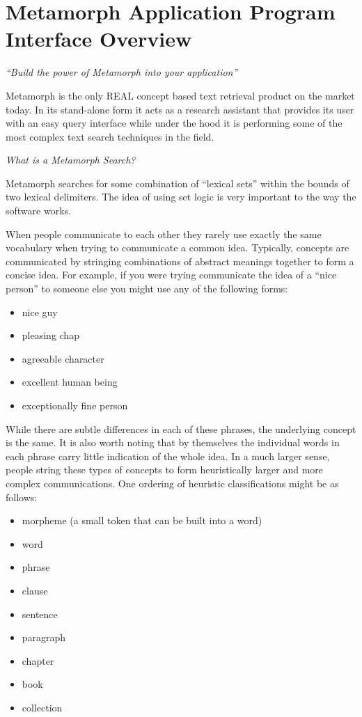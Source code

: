 %
\chapter{Metamorph Application Program Interface Overview}
{\em ``Build the power of Metamorph into your application''}

Metamorph is the only REAL concept based text retrieval product on
the market today.  In its stand-alone form it acts as a research
assistant that provides its user with an easy query interface
while under the hood it is performing some of the most complex
text search techniques in the field.

{\em What is a Metamorph Search?}

Metamorph searches for some combination of ``lexical sets'' within
the bounds of two lexical delimiters.  The idea of using set logic
is very important to the way the software works.

When people communicate to each other they rarely use exactly the
same vocabulary when trying to communicate a common idea.
Typically, concepts are communicated by stringing combinations of
abstract meanings together to form a concise idea.  For example,
if you were trying communicate the idea of a ``nice person'' to
someone else you might use any of the following forms:

\begin{itemize}
\item nice guy
\item pleasing chap
\item agreeable character
\item excellent human being
\item exceptionally fine person
\end{itemize}

While there are subtle differences in each of these phrases, the
underlying concept is the same.  It is also worth noting that by
themselves the individual words in each phrase carry little
indication of the whole idea.  In a much larger sense, people
string these types of concepts to form heuristically larger and
more complex communications.  One ordering of heuristic
classifications might be as follows:

\begin{itemize}
\item morpheme   (a small token that can be built into a word)
\item word
\item phrase
\item clause
\item sentence
\item paragraph
\item chapter
\item book
\item collection
\end{itemize}

